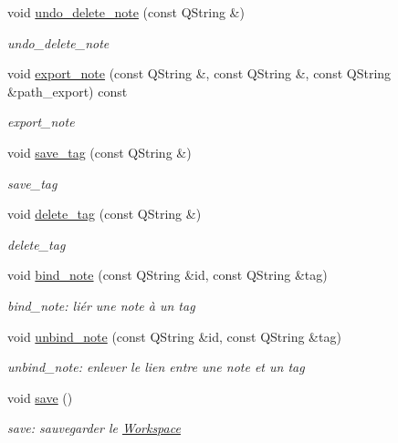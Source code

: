 \begin{DoxyCompactItemize}
void \hyperlink{classworkspace_1_1_workspace_a18b85cb58ef636b9cf199267ba1a0b50}{undo\-\_\-delete\-\_\-note} (const Q\-String \&)
\begin{DoxyCompactList}\small\item\em undo\-\_\-delete\-\_\-note \end{DoxyCompactList}\item 
void \hyperlink{classworkspace_1_1_workspace_a2e81bd3729b705d67086c394df7901ef}{export\-\_\-note} (const Q\-String \&, const Q\-String \&, const Q\-String \&path\-\_\-export) const 
\begin{DoxyCompactList}\small\item\em export\-\_\-note \end{DoxyCompactList}\item 
void \hyperlink{classworkspace_1_1_workspace_a191c786701c0bcfcb216f7a1f06d3df4}{save\-\_\-tag} (const Q\-String \&)
\begin{DoxyCompactList}\small\item\em save\-\_\-tag \end{DoxyCompactList}\item 
void \hyperlink{classworkspace_1_1_workspace_ac02f8eec10bd9dcbbad3a1e586f7ae1d}{delete\-\_\-tag} (const Q\-String \&)
\begin{DoxyCompactList}\small\item\em delete\-\_\-tag \end{DoxyCompactList}\item 
void \hyperlink{classworkspace_1_1_workspace_ab99fabc94aa0065443e72ea252969927}{bind\-\_\-note} (const Q\-String \&id, const Q\-String \&tag)
\begin{DoxyCompactList}\small\item\em bind\-\_\-note\-: liér une note à un tag \end{DoxyCompactList}\item 
void \hyperlink{classworkspace_1_1_workspace_a5ea330230fea932aa4de1aa3aea5bcc7}{unbind\-\_\-note} (const Q\-String \&id, const Q\-String \&tag)
\begin{DoxyCompactList}\small\item\em unbind\-\_\-note\-: enlever le lien entre une note et un tag \end{DoxyCompactList}\item 
void \hyperlink{classworkspace_1_1_workspace_a6716ce0aa8484fcb6ab5be51a2ac2acc}{save} ()
\begin{DoxyCompactList}\small\item\em save\-: sauvegarder le \hyperlink{classworkspace_1_1_workspace}{Workspace} \end{DoxyCompactList}\item 

\end{DoxyCompactItemize}
